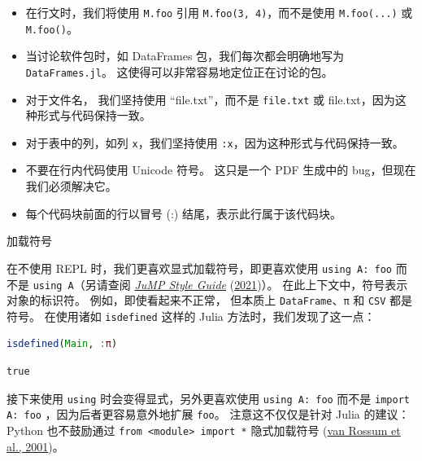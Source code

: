 \documentclass[
  notoc %
]{tufte-book}
\makeatletter
\providecommand{\tightlist}{%
  \setlength{\itemsep}{0pt}\setlength{\parskip}{0pt}
}
\newcommand{\passthrough}[1]{#1}
\renewcommand\subsubsection{%
\@startsection{subsubsection}{3}{\z@ }{-3.25ex\@plus -1ex \@minus -.2ex}{1.5ex \@plus .2ex}{\normalfont \normalsize \bfseries }
}
\makeatother
\begin{document}
\begin{itemize}
\tightlist
\item
  在行文时，我们将使用 \passthrough{\lstinline!M.foo!} 引用
  \passthrough{\lstinline!M.foo(3, 4)!}，而不是使用
  \passthrough{\lstinline!M.foo(...)!} 或
  \passthrough{\lstinline!M.foo()!}。
\item
  当讨论软件包时，如 DataFrames 包，我们每次都会明确地写为
  \passthrough{\lstinline!DataFrames.jl!}。
  这使得可以非常容易地定位正在讨论的包。
\item
  对于文件名， 我们坚持使用 ``file.txt''，而不是
  \passthrough{\lstinline!file.txt!} 或
  file.txt，因为这种形式与代码保持一致。
\item
  对于表中的列，如列 \passthrough{\lstinline!x!}，我们坚持使用
  \passthrough{\lstinline!:x!}，因为这种形式与代码保持一致。
\item
  不要在行内代码使用 Unicode 符号。 这只是一个 PDF 生成中的
  bug，但现在我们必须解决它。
\item
  每个代码块前面的行以冒号 (:) 结尾，表示此行属于该代码块。
\end{itemize}

\hypertarget{ux52a0ux8f7dux7b26ux53f7}{%
\subsubsection{加载符号}\label{ux52a0ux8f7dux7b26ux53f7}}

在不使用 REPL 时，我们更喜欢显式加载符号，即更喜欢使用
\passthrough{\lstinline!using A: foo!} 而不是
\passthrough{\lstinline!using A!}（另请查阅
\protect\hyperlink{ref-jump2021using}{\emph{JuMP Style Guide}}
(\protect\hyperlink{ref-jump2021using}{2021})）。
在此上下文中，符号表示对象的标识符。 例如，即使看起来不正常， 但本质上
\passthrough{\lstinline!DataFrame!}、\passthrough{\lstinline!π!} 和
\passthrough{\lstinline!CSV!} 都是符号。 在使用诸如
\passthrough{\lstinline!isdefined!} 这样的 Julia
方法时，我们发现了这一点：

\begin{lstlisting}[language=Julia]
isdefined(Main, :π)
\end{lstlisting}

\begin{lstlisting}[language=Output]
true
\end{lstlisting}

接下来使用 \passthrough{\lstinline!using!} 时会变得显式，另外更喜欢使用
\passthrough{\lstinline!using A: foo!} 而不是
\passthrough{\lstinline!import A: foo!} ，因为后者更容易意外地扩展
\passthrough{\lstinline!foo!}。 注意这不仅仅是针对 Julia 的建议： Python
也不鼓励通过 \passthrough{\lstinline!from <module> import *!}
隐式加载符号 (\protect\hyperlink{ref-pep8}{van Rossum et al., 2001})。
\end{document}
